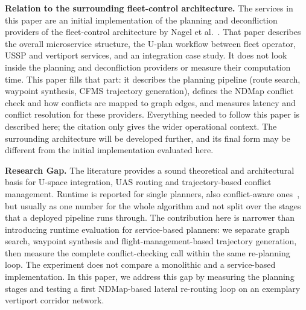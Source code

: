 \noindent
\textbf{Relation to the surrounding fleet-control architecture.}
The services in this paper are an initial implementation of the planning and deconfliction providers of the fleet-control architecture by Nagel et al.~\cite{nagel2026microservice}. That paper describes the overall microservice structure, the U-plan workflow between fleet operator, USSP and vertiport services, and an integration case study. It does not look inside the planning and deconfliction providers or measure their computation time. This paper fills that part: it describes the planning pipeline (route search, waypoint synthesis, CFMS trajectory generation), defines the NDMap conflict check and how conflicts are mapped to graph edges, and measures latency and conflict resolution for these providers. Everything needed to follow this paper is described here; the citation only gives the wider operational context. The surrounding architecture will be developed further, and its final form may be different from the initial implementation evaluated here.

\medskip
\noindent
\textbf{Research Gap.}
The literature provides a sound theoretical and architectural basis for U-space integration, UAS routing and trajectory-based conflict management. Runtime is reported for single planners, also conflict-aware ones~\cite{dai2021_conflict_free_4d_uam}, but usually as one number for the whole algorithm and not split over the stages that a deployed pipeline runs through. The contribution here is narrower than introducing runtime evaluation for service-based planners: we separate graph search, waypoint synthesis and flight-management-based trajectory generation, then measure the complete conflict-checking call within the same re-planning loop. The experiment does not compare a monolithic and a service-based implementation. In this paper, we address this gap by measuring the planning stages and testing a first NDMap-based lateral re-routing loop on an exemplary vertiport corridor network.
